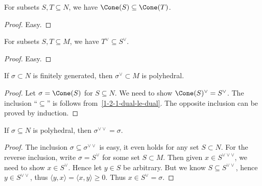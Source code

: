 \begin{proposition}
  \label{1-2-1-cone-span-le-span}
  For subsets \( S, T \subseteq N \), we have \( \Cone(S) \subseteq
  \Cone(T) \).
\end{proposition}
\begin{proof}
  \uses{}
  Easy.
\end{proof}

\begin{proposition}
  \label{1-2-1-dual-le-dual}
  For subsets \( S, T \subseteq M \), we have \( T^\vee \subseteq
  S^\vee \).
\end{proposition}
\begin{proof}
  \uses{}
  Easy.
\end{proof}

\begin{proposition}
  \label{1-2-1-dual-polyhedral}
  \uses{}
  If \( \sigma \subset N \) is finitely generated, then \( \sigma^\vee
  \subset M \) is polyhedral.
\end{proposition}
\begin{proof}
  Let \( \sigma = \Cone(S) \) for \( S \subseteq N \). We need to show
  \( \Cone(S)^\vee = S^\vee \). The inclusion ``\( \subseteq \)'' is
  follows from~\ref{1-2-1-dual-le-dual}. The opposite inclusion can be
  proved by induction.
\end{proof}

\begin{proposition}
  \label{1-2-1-double-dual-polyhedral-cone}
  If \( \sigma \subseteq N \) is polyhedral, then \( \sigma^{\vee\vee}
  = \sigma \).
\end{proposition}
\begin{proof}
  \uses{}
  The inclusion \( \sigma \subseteq \sigma^{\vee\vee} \) is
  easy, it even holds for any set \( S \subset N \). For the reverse
  inclusion, write \( \sigma = S^\vee \) for some set \( S \subset M
  \). Then given \( x \in S^{\vee\vee\vee} \), we need to show \( x
  \in S^\vee \). Hence let \( y \in S \) be arbitrary. But we know \(
  S \subseteq S^{\vee\vee} \), hence \( y \in S^{\vee\vee} \), thus \(
  \langle y, x \rangle = \langle x, y \rangle \geq 0 \). Thus \( x \in
  S^{\vee} = \sigma \).
\end{proof}



